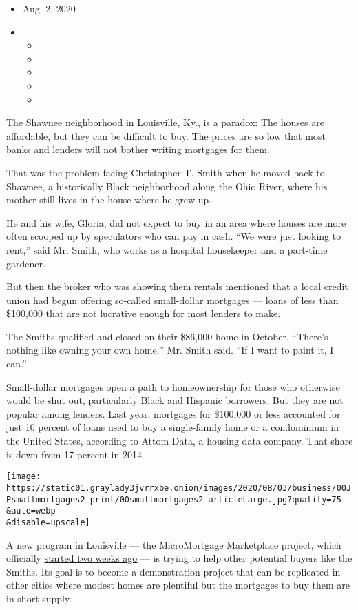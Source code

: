 \begin{itemize}
\item
  Aug. 2, 2020
\item
  \begin{itemize}
  \item
  \item
  \item
  \item
  \item
  \end{itemize}
\end{itemize}

The Shawnee neighborhood in Louisville, Ky., is a paradox: The houses
are affordable, but they can be difficult to buy. The prices are so low
that most banks and lenders will not bother writing mortgages for them.

That was the problem facing Christopher T. Smith when he moved back to
Shawnee, a historically Black neighborhood along the Ohio River, where
his mother still lives in the house where he grew up.

He and his wife, Gloria, did not expect to buy in an area where houses
are more often scooped up by speculators who can pay in cash. ``We were
just looking to rent,'' said Mr. Smith, who works as a hospital
housekeeper and a part-time gardener.

But then the broker who was showing them rentals mentioned that a local
credit union had begun offering so-called small-dollar mortgages ---
loans of less than \$100,000 that are not lucrative enough for most
lenders to make.

The Smiths qualified and closed on their \$86,000 home in October.
``There's nothing like owning your own home,'' Mr. Smith said. ``If I
want to paint it, I can.''

Small-dollar mortgages open a path to homeownership for those who
otherwise would be shut out, particularly Black and Hispanic borrowers.
But they are not popular among lenders. Last year, mortgages for
\$100,000 or less accounted for just 10 percent of loans used to buy a
single-family home or a condominium in the United States, according to
Attom Data, a housing data company. That share is down from 17 percent
in 2014.

\texttt{[image: https://static01.graylady3jvrrxbe.onion/images/2020/08/03/business/00JPsmallmortgages2-print/00smallmortgages2-articleLarge.jpg?quality=75\\\&auto=webp\\\&disable=upscale]}

A new program in Louisville --- the MicroMortgage Marketplace project,
which officially
\href{https://www.newswire.com/news/micromortgage-marketplace-launches-in-support-of-small-dollar-home-21180593}{started
two weeks ago} --- is trying to help other potential buyers like the
Smiths. Its goal is to become a demonstration project that can be
replicated in other cities where modest homes are plentiful but the
mortgages to buy them are in short supply.

